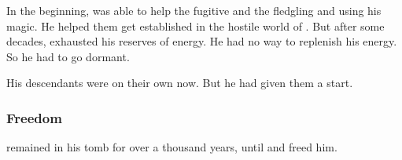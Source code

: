 In the beginning, \Semiza was able to help the fugitive \nephilim and the fledgling \resphain and \humans using his magic.
He helped them get established in the hostile world of \Nyx. 
But after some decades, \Semiza exhausted his reserves of energy.
He had no way to replenish his energy.
So he had to go dormant.

His descendants were on their own now.
But he had given them a start. 





\subsubsection{Freedom}
\Semiza remained in his tomb for over a thousand years, until  and freed him.























